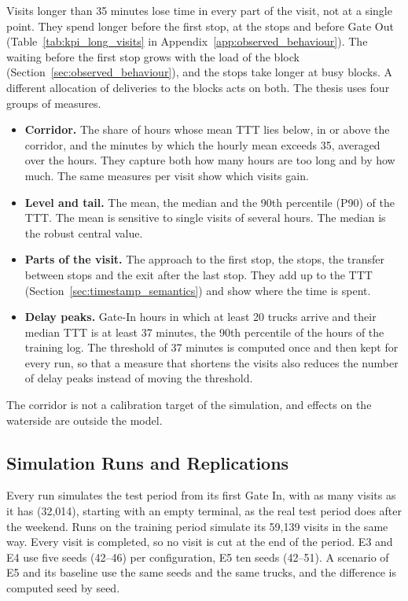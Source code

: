 Visits longer than 35 minutes lose time in every part of the visit, not at a single
point. They spend longer before the first stop, at the stops and before Gate Out
(Table~\ref{tab:kpi_long_visits} in Appendix~\ref{app:observed_behaviour}). The
waiting before the first stop grows with the load of the block
(Section~\ref{sec:observed_behaviour}), and the stops take longer at busy blocks. A
different allocation of deliveries to the blocks acts on both. The thesis uses
four groups of measures.
\begin{itemize}
\item \textbf{Corridor.} The share of hours whose mean TTT lies below, in or above
the corridor, and the minutes by which the hourly mean exceeds 35, averaged over
the hours. They capture both how many hours are too long and by how much. The same
measures per visit show which visits gain.
\item \textbf{Level and tail.} The mean, the median and the 90th percentile (P90)
of the TTT. The mean is sensitive to single visits of several hours. The median is
the robust central value.
\item \textbf{Parts of the visit.} The approach to the first stop, the stops, the
transfer between stops and the exit after the last stop. They add up to the TTT
(Section~\ref{sec:timestamp_semantics}) and show where the time is spent.
\item \textbf{Delay peaks.} Gate-In hours in which at least 20 trucks arrive and
their median TTT is at least 37 minutes, the 90th percentile of the hours of the training
log. The threshold of 37 minutes is computed once and then kept for every run, so
that a measure that shortens the visits also reduces the number of delay peaks
instead of moving the threshold.
\end{itemize}
The corridor is not a calibration target of the simulation, and effects on the
waterside are outside the model.

\subsection{Simulation Runs and Replications}
\label{sec:exp_runs}

Every run simulates the test period from its first Gate In, with as many visits as
it has (32,014), starting with an empty terminal, as the real test period does after
the weekend.
Runs on the training period simulate its 59,139 visits in the same way. Every visit
is completed, so no visit is cut at the end of the period. E3 and E4 use five
seeds (42--46) per configuration, E5 ten seeds (42--51). A scenario of E5 and its
baseline use the same seeds and the same trucks, and the difference is computed
seed by seed.

